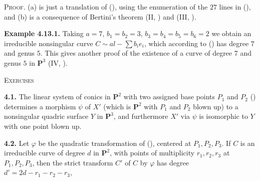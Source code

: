 {\smallskip
\noindent\textsc{Proof.} (a) is just a translation of (), using the enumeration of the $27$ lines in (), and (b) is a consequence of Bertini's theorem (II, ) and (III, ).

\medskip
\noindent\hypertarget{result-V-4.13.1}{}\textbf{Example 4.13.1.} Taking $a=7$, $b_1=b_2=3$, $b_3=b_4=b_5=b_6=2$ we obtain an irreducible nonsingular curve $C\sim al-\sum b_ie_i$, which according to () has degree $7$ and genus $5$. This gives another proof of the existence of a curve of degree $7$ and genus $5$ in $\mathbf P^3$ (IV, ).

\medskip
\noindent\textsc{Exercises}

\smallskip
\noindent\hypertarget{ex-V-4.1}{}\textbf{4.1.} The linear system of conics in $\mathbf P^2$ with two assigned base points $P_1$ and $P_2$ () determines a morphism $\psi$ of $X'$ (which is $\mathbf P^2$ with $P_1$ and $P_2$ blown up) to a nonsingular quadric surface $Y$ in $\mathbf P^3$, and furthermore $X'$ via $\psi$ is isomorphic to $Y$ with one point blown up.

\smallskip
\noindent\hypertarget{ex-V-4.2}{}\textbf{4.2.} Let $\varphi$ be the quadratic transformation of (), centered at $P_1,P_2,P_3$. If $C$ is an irreducible curve of degree $d$ in $\mathbf P^2$, with points of multiplicity $r_1,r_2,r_3$ at $P_1,P_2,P_3$\EditionText{}, then the strict transform $C'$ of $C$ by $\varphi$ has degree $d'=2d-r_1-r_2-r_3$,}
